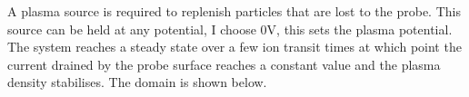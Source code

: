     A plasma source is required to replenish particles that are lost to the probe. This source can be held at any potential, I choose 0V, this sets the plasma potential. The system reaches a steady state over a few ion transit times at which point the current drained by the probe surface reaches a constant value and the plasma density stabilises. The domain is shown below. 
%
%
